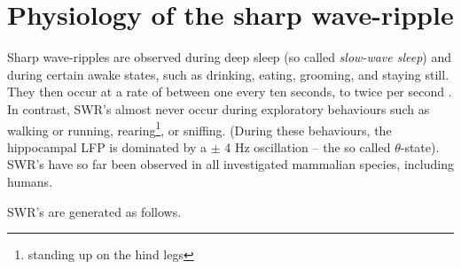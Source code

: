 \section{Physiology of the sharp wave-ripple}
\label{sec:physiology}

Sharp wave-ripples are observed during deep sleep (so called \emph{slow-wave sleep}) and during certain awake states, such as drinking, eating, grooming, and staying still. They then occur at a rate of between one every ten seconds, to twice per second \cite{Girardeau2011}. In contrast, SWR's almost never occur during exploratory behaviours such as walking or running, rearing\footnote{standing up on the hind legs}, or sniffing. (During these behaviours, the hippocampal LFP is dominated by a $\pm$ 4 Hz oscillation -- the so called $\theta$-state). SWR's have so far been observed in all investigated mammalian species, including humans. \cite{Buzsaki2015}

SWR's are generated as follows. 
